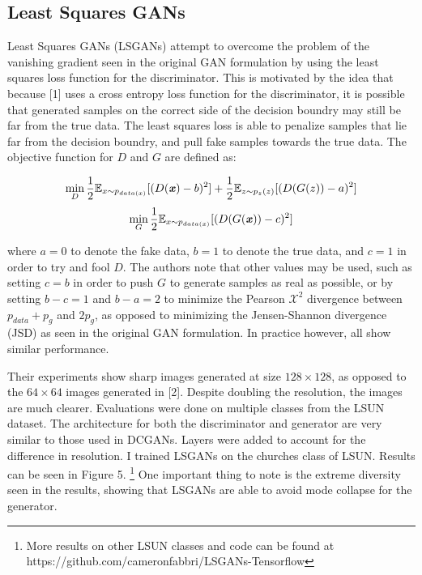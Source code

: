 \documentclass{article}
\begin{document}
\subsection{Least Squares GANs}
Least Squares GANs (LSGANs) attempt to overcome the problem of the vanishing gradient seen in the original GAN formulation by using the least squares loss function for the
discriminator. This is motivated by the idea that because [1] uses a cross entropy loss function for the discriminator, it is possible that generated samples on the correct side of the
decision boundry may still be far from the true data. The least squares loss is able to penalize samples that lie far from the decision boundry, and pull fake samples towards the
true data. The objective function for $D$ and $G$ are defined as:

\[\min\limits_{D} \frac{1}{2} \mathbb{E}_{x \sim p_{data(x)}} [(D(\textbf{\textit{x}})-b)^2] + \frac{1}{2} \mathbb{E}_{z \sim p_z(z)}[(D(G(z)) - a)^2]\]
\[\min\limits_{G} \frac{1}{2} \mathbb{E}_{x \sim p_{data(x)}} [(D(G(\textbf{\textit{x}}))-c)^2] \]

\noindent where $a=0$ to denote the fake data, $b=1$ to denote the true data, and $c=1$ in order to try and fool $D$. The authors note that other values
may be used, such as setting $c=b$ in order to push $G$ to generate samples as real as possible, or by setting $b-c=1$ and $b-a=2$ to minimize the Pearson
$\mathcal{X}^2$ divergence between $p_{data}+p_g$ and $2p_g$, as opposed to minimizing the Jensen-Shannon divergence (JSD) as seen in the original GAN
formulation. In practice however, all show similar performance. \newline

\noindent Their experiments show sharp images generated at size $128\times128$, as opposed to the $64\times64$ images generated in [2]. Despite doubling
the resolution, the images are much clearer. Evaluations were done on multiple classes from the LSUN dataset. The architecture for both the discriminator
and generator are very similar to those used in DCGANs. Layers were added to account for the difference in resolution. I trained LSGANs on the churches
class of LSUN. Results can be seen in Figure 5. \footnote{More results on other LSUN classes and code can be found at https://github.com/cameronfabbri/LSGANs-Tensorflow}
One important thing to note is the extreme diversity seen in the results, showing that LSGANs are able to avoid mode collapse for the generator.
\end{document}
